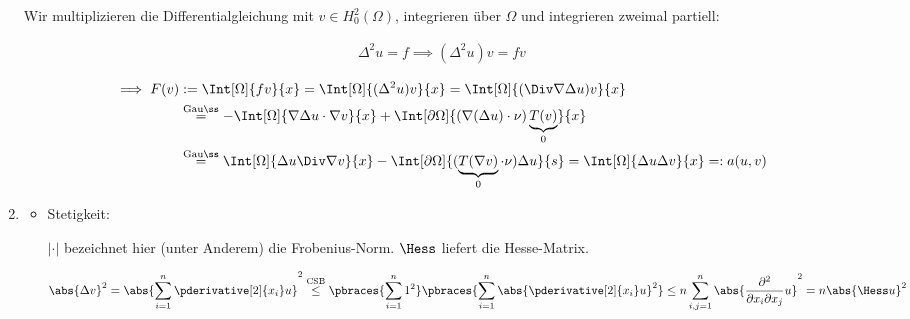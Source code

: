 \begin{solution}
\begin{enumerate}[label = (\alph*)]

  Wir multiplizieren die Differentialgleichung mit $v \in H_0^2(\Omega)$, integrieren über $\Omega$ und integrieren zweimal partiell:

  \begin{align*}
    \Delta^2 u = f
    \implies
    (\Delta^2 u) v = f v
  \end{align*}

  \begin{align*}
    \implies
    F(v)
    & :=
    \Int[\Omega]{f v}{x}
    =
    \Int[\Omega]{(\Delta^2 u) v}{x}
    =
    \Int[\Omega]{(\Div \nabla \Delta u) v}{x} \\
    & \stackrel
    {
      \mathrm{Gauß}
    }{=}
    -\Int[\Omega]{\nabla \Delta u \cdot \nabla v}{x}
    +
    \Int[\partial \Omega]{(\nabla (\Delta u) \cdot \nu) \underbrace{T(v)}_0}{x} \\
    & \stackrel
    {
      \mathrm{Gauß}
    }{=}
    \Int[\Omega]{\Delta u \Div \nabla v}{x}
    -
    \Int[\partial \Omega]{(\underbrace{T(\nabla v)}_0 \cdot \nu) \Delta u}{s}
    =
    \Int[\Omega]{\Delta u \Delta v}{x}
    =:
    a(u, v)
  \end{align*}

  \item

  \begin{itemize}
    \item Stetigkeit:
    
    $|\cdot|$ bezeichnet hier (unter Anderem) die Frobenius-Norm.
    $\Hess$ liefert die Hesse-Matrix.

    \begin{align*}
      \abs{\Delta v}^2
      =
      \abs
      {
        \sum_{i=1}^n
        \pderivative[2]{x_i} u
      }^2
      \stackrel
      {
        \mathrm{CSB}
      }{\leq}
      \pbraces
      {
        \sum_{i=1}^n
        1^2
      }
      \pbraces
      {
        \sum_{i=1}^n
        \abs{\pderivative[2]{x_i} u}^2
      }
      \leq
      n
      \sum_{i,j=1}^n
      \abs
      {
        \frac{\partial^2}{\partial x_i \partial x_j} u
      }^2
      =
      n \abs{\Hess u}^2
    \end{align*}


\end{itemize}
\end{enumerate}
\end{solution}
